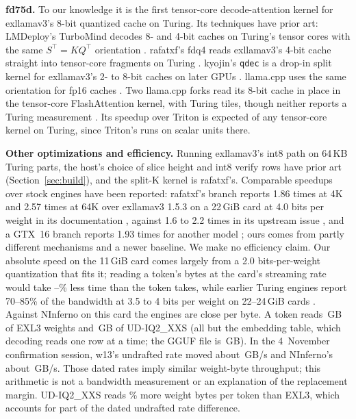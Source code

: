 \documentclass[11pt,letterpaper]{article}
\newcommand{\q}[1]{\texttt{#1}}
\begin{document}
\textbf{fd75d.} To our knowledge it is the first tensor-core decode-attention
kernel for exllamav3's 8-bit quantized cache on Turing. Its techniques have prior art: LMDeploy's TurboMind decodes 8- and 4-bit caches on Turing's tensor
cores with the same $S^{\top}=KQ^{\top}$ orientation
\citep{lmdeploy2024turbomind}. rafatxf's fdq4 reads exllamav3's 4-bit cache
straight into tensor-core fragments on Turing \citep{rafatxf2026turing}.
kyojin's \q{qdec} is a drop-in split kernel for exllamav3's 2- to 8-bit caches
on later GPUs \citep{yamz2026kyojin}. llama.cpp uses the same orientation
for fp16 caches \citep{gerganov2023llamacpp}. Two llama.cpp forks read
its 8-bit cache in place in the tensor-core FlashAttention kernel, with
Turing tiles, though neither reports a Turing measurement
\citep{piggidragon2026mmaq,twoxforever2026q8}. Its speedup over Triton is
expected of any tensor-core kernel on Turing, since Triton's runs on scalar
units there.

\textbf{Other optimizations and efficiency.} Running exllamav3's int8 path on 64\,KB Turing parts,
the host's choice of slice height and int8 verify rows have prior art
(Section~\ref{sec:build}), and the split-K kernel is rafatxf's. Comparable speedups over stock engines have been reported: rafatxf's branch reports
1.86 times at 4K and 2.57 times at 64K over exllamav3 1.5.3 on a 22\,GiB card at
4.0 bits per weight in its documentation \citep{rafatxf2026turing}, against
1.6 to 2.2 times in its upstream issue \citep{rafatxf2026issue417}, and a GTX~16 branch reports
1.93 times for another model \citep{nalimcos2026gtx16}; ours comes from
partly different mechanisms and a newer baseline. We make no efficiency claim. Our
absolute speed on the 11\,GiB card comes largely from a 2.0 bits-per-weight
quantization that fits it; reading a token's bytes at the card's streaming
rate would take \PeBytesErrMin--\PeBytesErrMax\% less time than the token
takes, while earlier Turing engines report 70--85\% of the bandwidth at 3.5 to
4 bits per weight on 22--24\,GiB cards
\citep{ninfer2026titan,rafatxf2026turing,vcruz3052026exl3turing}. Against
NInferno on this card the engines are close per byte. A token reads
\PeTokGbExl\,GB of EXL3 weights and \PeTokGbIxxs\,GB of UD-IQ2\_XXS (all
but the embedding table, which decoding reads one row at a time; the GGUF file
is \PeFileGbIxxs\,GB). In the 4~November confirmation session, w13's undrafted rate moved
about \PeCfGbsW\,GB/s and NInferno's about \PeCfGbsNif\,GB/s. Those dated rates imply similar weight-byte throughput; this arithmetic
is not a bandwidth measurement or an explanation of the replacement margin. UD-IQ2\_XXS reads
\PeTokBytesPct\% more weight bytes per token than EXL3, which accounts for
part of the dated undrafted rate difference.
\end{document}
